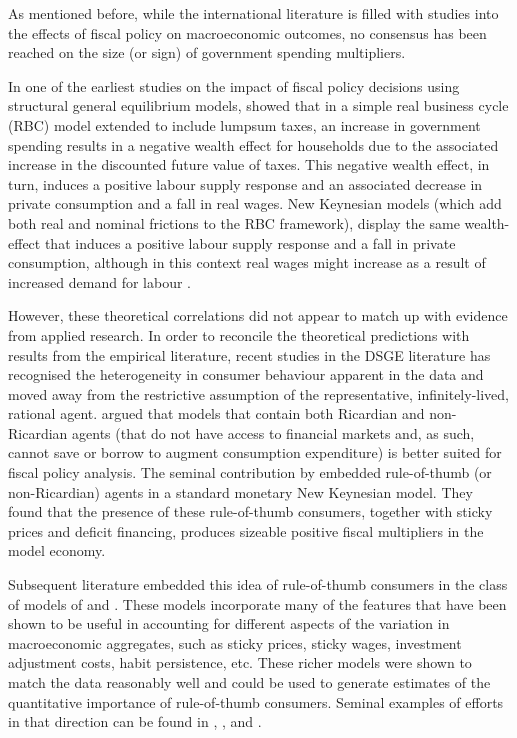 \documentclass[a4paper,11pt]{article}
\numberwithin{equation}{section}
\begin{document}
	As mentioned before, while the international literature is filled with studies into the effects of fiscal policy on macroeconomic outcomes, no consensus has been reached on the size (or sign) of government spending multipliers. 
	
	In one of the earliest studies on the impact of fiscal policy decisions using structural general equilibrium models, \cite{baxter1993} showed that in a simple real business cycle (RBC) model extended to include lumpsum taxes, an increase in government spending results in a negative wealth effect for households due to the associated increase in the discounted future value of taxes. This negative wealth effect, in turn, induces a positive labour supply response and an associated decrease in private consumption and a fall in real wages. New Keynesian models (which add both real and nominal frictions to the RBC framework), display the same wealth-effect that induces a positive labour supply response and a fall in private consumption, although in this context real wages might increase as a result of increased demand for labour \citep{forni2009}. 
	
	However, these theoretical correlations did not appear to match up with evidence from applied research. In order to reconcile the theoretical predictions with results from the empirical literature, recent studies in the DSGE literature has recognised the heterogeneity in consumer behaviour apparent in the data and moved away from the restrictive assumption of the representative, infinitely-lived, rational agent. \cite{mankiw} argued that models that contain both Ricardian and non-Ricardian agents (that do not have access to financial markets and, as such, cannot save or borrow to augment consumption expenditure) is better suited for fiscal policy analysis. The seminal contribution by \cite{gali} embedded rule-of-thumb (or non-Ricardian) agents in a standard monetary New Keynesian model. They found that the presence of these rule-of-thumb consumers, together with sticky prices and deficit financing, produces sizeable positive fiscal multipliers in the model economy.
	
	Subsequent literature embedded this idea of rule-of-thumb consumers in the class of models of \cite{smets2005,smets2007} and \cite{christiano2005}. These models incorporate many of the features that have been shown to be useful in accounting for different aspects of the variation in macroeconomic aggregates, such as sticky prices, sticky wages, investment adjustment costs, habit persistence, etc. These richer models were shown to match the data reasonably well and could be used to generate estimates of the quantitative importance of rule-of-thumb consumers. Seminal examples of efforts in that direction can be found in \cite{coenen2005}, \cite{erceg2006}, \cite{rabanal2006} and \cite{forni2009}. 
	
\end{document}
